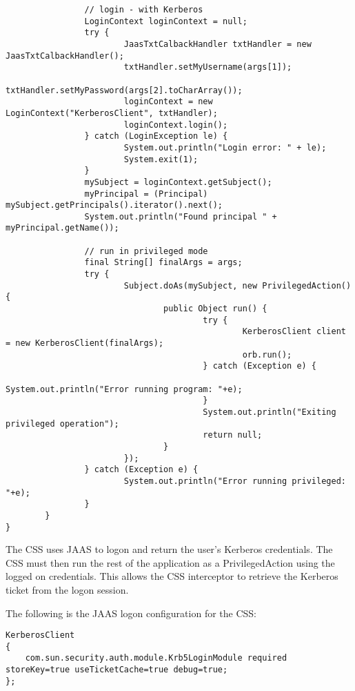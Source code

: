 \begin{scriptsize}
\begin{verbatim}
                // login - with Kerberos
                LoginContext loginContext = null;
                try {
                        JaasTxtCalbackHandler txtHandler = new JaasTxtCalbackHandler();
                        txtHandler.setMyUsername(args[1]);
                        txtHandler.setMyPassword(args[2].toCharArray());
                        loginContext = new LoginContext("KerberosClient", txtHandler);
                        loginContext.login();
                } catch (LoginException le) {
                        System.out.println("Login error: " + le);
                        System.exit(1);
                }
                mySubject = loginContext.getSubject();
                myPrincipal = (Principal) mySubject.getPrincipals().iterator().next();
                System.out.println("Found principal " + myPrincipal.getName());

                // run in privileged mode
                final String[] finalArgs = args;
                try {
                        Subject.doAs(mySubject, new PrivilegedAction() {
                                public Object run() {
                                        try {
                                                KerberosClient client = new KerberosClient(finalArgs);
                                                orb.run();
                                        } catch (Exception e) {
                                                System.out.println("Error running program: "+e);
                                        }
                                        System.out.println("Exiting privileged operation");
                                        return null;
                                }
                        });
                } catch (Exception e) {
                        System.out.println("Error running privileged: "+e);
                }
        }
}
\end{verbatim}
\end{scriptsize}

The CSS uses JAAS to logon and return the user's Kerberos credentials.
The CSS must then run the rest of the application as a PrivilegedAction using
the logged on credentials. This allows the CSS interceptor to retrieve the
Kerberos ticket from the logon session.

The following is the JAAS logon configuration for the CSS:

\begin{scriptsize}
\begin{verbatim}
KerberosClient
{
    com.sun.security.auth.module.Krb5LoginModule required storeKey=true useTicketCache=true debug=true;
};
\end{verbatim}
\end{scriptsize}


